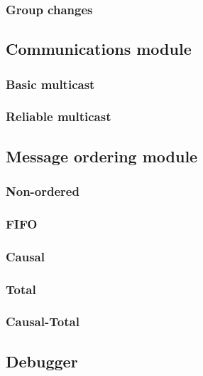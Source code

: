 \documentclass[titlepage, twocolumn, a4paper, 10pt]{article}
\begin{document}
\subsubsection{Group changes}\label{sec:group-changes}


\subsection{Communications module}\label{sec:communications-module}
\subsubsection{Basic multicast}\label{sec:basic-multicast}
\subsubsection{Reliable multicast}\label{sec:reliable-multicast}


\subsection{Message ordering module}\label{sec:message-ordering-module}
\subsubsection{Non-ordered}\label{sec:-non-ordered}
\subsubsection{FIFO}\label{sec:fifo}
\subsubsection{Causal}\label{sec:causal}
\subsubsection{Total}\label{sec:total}
\subsubsection{Causal-Total}\label{sec:causal-total}


\subsection{Debugger}\label{sec:debugger}
\end{document}
